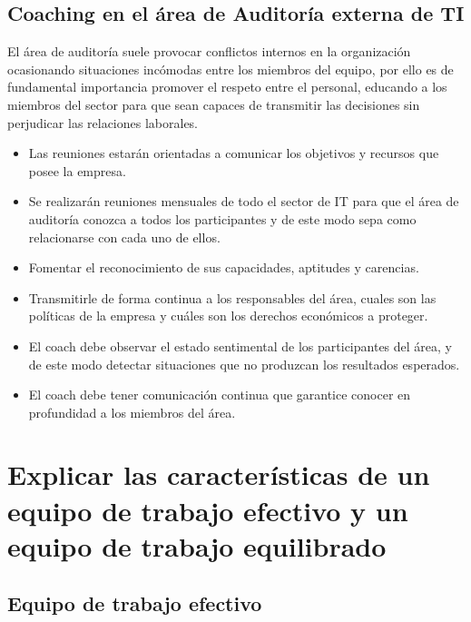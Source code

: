         \subsection{Coaching en el área de Auditoría externa de TI}        
        El área de auditoría  suele provocar conflictos internos en la organización ocasionando situaciones incómodas entre los miembros del equipo, por ello es de fundamental importancia promover el respeto entre el personal, educando a los miembros del sector para que sean capaces de transmitir las decisiones sin perjudicar las relaciones laborales.
        \begin{itemize}
	        \item Las reuniones estarán orientadas a comunicar los objetivos y recursos que posee la empresa.
            \item Se realizarán reuniones mensuales de todo el sector de IT para que el área de auditoría conozca a todos los participantes y de este modo sepa como relacionarse con cada uno de ellos.
            \item Fomentar el reconocimiento de sus capacidades, aptitudes y carencias.
            \item Transmitirle de forma continua a los responsables del área, cuales son las políticas de la empresa y cuáles son los derechos económicos a proteger.
            \item  El coach debe observar el estado sentimental de los participantes del área, y de este modo detectar situaciones que no produzcan los resultados esperados.
            \item El coach debe tener comunicación continua que garantice conocer en profundidad a los miembros del área.
            
        \end{itemize}



\newpage

    \section{Explicar las \textbf{características de un equipo de trabajo efectivo y un equipo de trabajo equilibrado}} %
    

\subsection{Equipo de trabajo efectivo}

